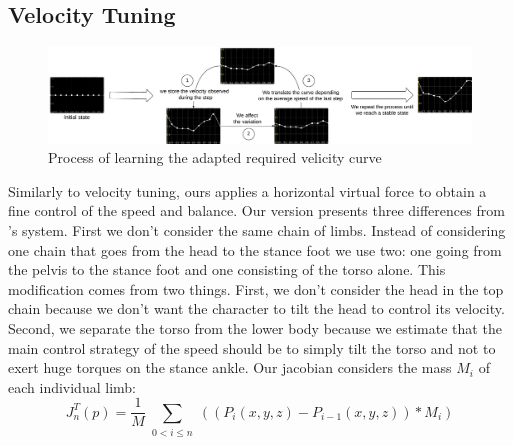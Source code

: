 \documentclass[conference]{acmsiggraph}
\begin{document}
\subsection{Velocity Tuning}
\label{sec:speed_virt_force}

\begin{figure}[t]
\centering
\includegraphics[scale=0.45]{images/speed_curve_learner.pdf}
\caption{Process of learning the adapted required velicity curve}
\label{fig:speed_curve_learner}
\end{figure}


Similarly to \cite{coros2010generalized} velocity tuning, ours applies a horizontal virtual force to obtain a fine control of the speed and balance. Our version presents three differences from \cite{coros2010generalized}'s system. First we don't consider the same chain of limbs. Instead of considering one chain that goes from the head to the stance foot we use two: one going from the pelvis to the stance foot and one consisting of the torso alone. This modification comes from two things. First, we don't consider the head in the top chain because we don't want the character to tilt the head to control its velocity. Second, we separate the torso from the lower body because we estimate that the main control strategy of the speed should be to simply tilt the torso and not to exert huge torques on the stance ankle. Our jacobian considers the mass $M_i$ of each individual limb:
$$
J_n ^T (p)=\frac{1}{M}\sum_{\substack{0<i\leq n}} ((P_i(x,y,z)-P_{i-1}(x,y,z))*M_i)
$$
\end{document}
